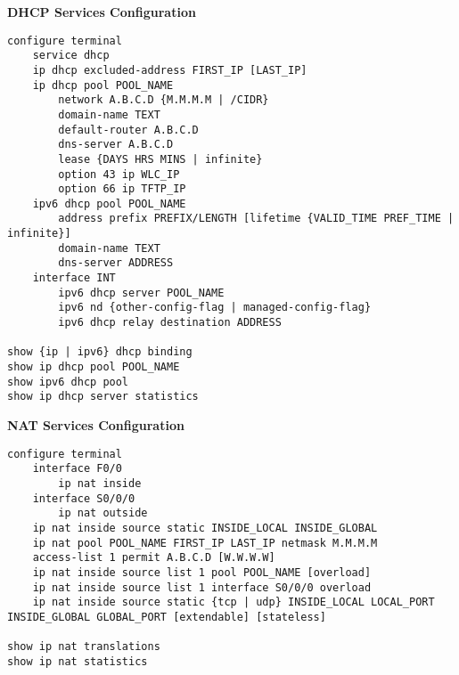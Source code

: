 \documentclass[12pt]{article}
\begin{document}
	\textbf{DHCP Services Configuration}
	\begin{lstlisting}
configure terminal
	service dhcp
	ip dhcp excluded-address FIRST_IP [LAST_IP]
	ip dhcp pool POOL_NAME
		network A.B.C.D {M.M.M.M | /CIDR}
		domain-name TEXT
		default-router A.B.C.D
		dns-server A.B.C.D
		lease {DAYS HRS MINS | infinite}
		option 43 ip WLC_IP
		option 66 ip TFTP_IP
	ipv6 dhcp pool POOL_NAME
		address prefix PREFIX/LENGTH [lifetime {VALID_TIME PREF_TIME | infinite}]
		domain-name TEXT
		dns-server ADDRESS
	interface INT
		ipv6 dhcp server POOL_NAME
		ipv6 nd {other-config-flag | managed-config-flag}
		ipv6 dhcp relay destination ADDRESS

show {ip | ipv6} dhcp binding
show ip dhcp pool POOL_NAME
show ipv6 dhcp pool
show ip dhcp server statistics
	\end{lstlisting}

	\textbf{NAT Services Configuration}
	\begin{lstlisting}
configure terminal
	interface F0/0
		ip nat inside
	interface S0/0/0
		ip nat outside
	ip nat inside source static INSIDE_LOCAL INSIDE_GLOBAL
	ip nat pool POOL_NAME FIRST_IP LAST_IP netmask M.M.M.M
	access-list 1 permit A.B.C.D [W.W.W.W]
	ip nat inside source list 1 pool POOL_NAME [overload]
	ip nat inside source list 1 interface S0/0/0 overload
	ip nat inside source static {tcp | udp} INSIDE_LOCAL LOCAL_PORT INSIDE_GLOBAL GLOBAL_PORT [extendable] [stateless]

show ip nat translations
show ip nat statistics
	\end{lstlisting}
\end{document}
